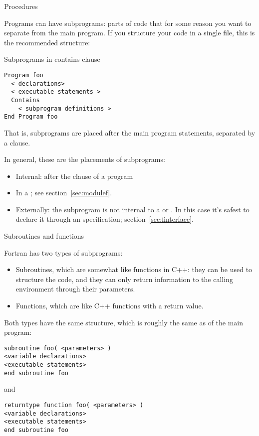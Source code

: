
 {Procedures}

Programs can have subprograms: parts of code that for some reason you
want to separate from the main program. If you structure your code in a single
file, this is the recommended structure:

\begin{block}{Subprograms in contains clause}
  \label{sl:contains}
\begin{verbatim}
Program foo
  < declarations>
  < executable statements >
  Contains
    < subprogram definitions >
End Program foo
\end{verbatim}
\end{block}

That is, subprograms are placed after the main program statements,
separated by a  clause.

In general, these are the  placements of subprograms:
\begin{itemize}
\item Internal: after the  clause of a program
\item In a ; see section~\ref{sec:modulef}.
\item Externally: the subprogram is not internal to a  or
  . In this case it's safest to declare it through an
   specification; section~\ref{sec:finterface}.
\end{itemize}
 {Subroutines and functions}

Fortran has two types of subprograms:
\begin{itemize}
\item Subroutines, which are somewhat like  functions in C++:
  they can be used to structure the code, and they can only return
  information to the calling environment through their parameters.
\item Functions, which are like C++ functions with a return value.
\end{itemize}

Both types have the same structure, which is roughly the same as of
the main program:
\begin{verbatim}
subroutine foo( <parameters> )
<variable declarations>
<executable statements>
end subroutine foo
\end{verbatim}
and
\begin{verbatim}
returntype function foo( <parameters> )
<variable declarations>
<executable statements>
end subroutine foo
\end{verbatim}

